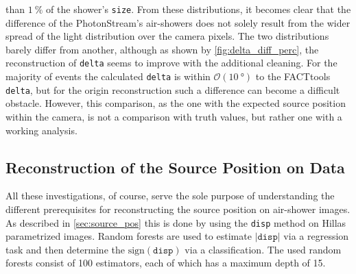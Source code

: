 than $\SI{1}{\percent}$ of the shower's \texttt{size}.
From these distributions, it becomes clear that the difference of the
PhotonStream's air-showers does not solely result from the wider spread of
the light distribution over the camera pixels. The two distributions barely
differ from another, although as shown by \autoref{fig:delta_diff_perc}, the
reconstruction of \texttt{delta} seems to improve with the additional
cleaning. For the majority of events the calculated \texttt{delta} is within
$\mathcal{O}(\SI{10}{\degree})$ to the FACTtools \texttt{delta}, but for the
origin reconstruction such a difference can become a difficult obstacle.
However, this comparison, as the one with the expected source position
within the camera, is not a comparison with truth values, but rather one
with a working analysis.

\subsection{Reconstruction of the Source Position on Data}

All these investigations, of course, serve the sole purpose of understanding
the different prerequisites for reconstructing the source position on
air-shower images. As described in \autoref{sec:source_pos} this is done by
using the \texttt{disp} method on Hillas parametrized images. Random forests
are used to estimate $|\texttt{disp}|$ via a regression task and then determine
the $\text{sign}(\texttt{disp})$ via a classification. The used random forests
consist of \num{100} estimators, each of which has a maximum depth of \num{15}.


